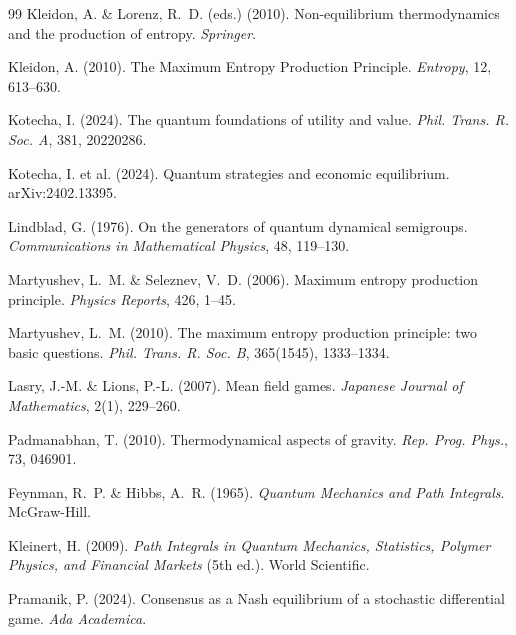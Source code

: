 \documentclass[12pt,a4paper]{article}
\theoremstyle{remark}
\begin{document}
\begin{thebibliography}{99}
Kleidon, A. \& Lorenz, R.~D. (eds.) (2010).
\newblock Non-equilibrium thermodynamics and the production of entropy.
\newblock \textit{Springer}.

Kleidon, A. (2010).
\newblock The Maximum Entropy Production Principle.
\newblock \textit{Entropy}, 12, 613--630.

Kotecha, I. (2024).
\newblock The quantum foundations of utility and value.
\newblock \textit{Phil. Trans. R. Soc. A}, 381, 20220286.

Kotecha, I. et al. (2024).
\newblock Quantum strategies and economic equilibrium.
\newblock arXiv:2402.13395.

Lindblad, G. (1976).
\newblock On the generators of quantum dynamical semigroups.
\newblock \textit{Communications in Mathematical Physics}, 48, 119--130.

Martyushev, L.~M. \& Seleznev, V.~D. (2006).
\newblock Maximum entropy production principle.
\newblock \textit{Physics Reports}, 426, 1--45.

Martyushev, L.~M. (2010).
\newblock The maximum entropy production principle: two basic questions.
\newblock \textit{Phil. Trans. R. Soc. B}, 365(1545), 1333--1334.

Lasry, J.-M. \& Lions, P.-L. (2007).
\newblock Mean field games.
\newblock \textit{Japanese Journal of Mathematics}, 2(1), 229--260.

Padmanabhan, T. (2010).
\newblock Thermodynamical aspects of gravity.
\newblock \textit{Rep. Prog. Phys.}, 73, 046901.

Feynman, R.~P. \& Hibbs, A.~R. (1965).
\newblock \textit{Quantum Mechanics and Path Integrals}.
\newblock McGraw-Hill.

Kleinert, H. (2009).
\newblock \textit{Path Integrals in Quantum Mechanics, Statistics, Polymer Physics, and Financial Markets} (5th ed.).
\newblock World Scientific.

Pramanik, P. (2024).
\newblock Consensus as a Nash equilibrium of a stochastic differential game.
\newblock \textit{Ada Academica}.


\end{thebibliography}
\end{document}
